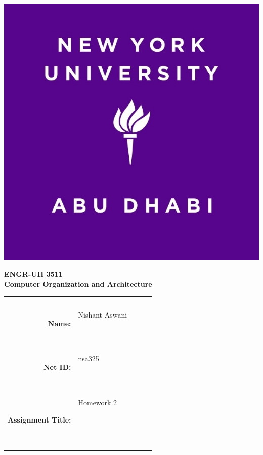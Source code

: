 \documentclass[11pt]{exam}
\newcommand{\myname}{Nishant Aswani}
\newcommand{\mynetid}{nsa325}
\newcommand{\myhwtype}{Homework}
\newcommand{\myhwnum}{2}
\newcommand{\mycoursenumber}{ENGR-UH 3511}
\newcommand{\myclassname}{Computer Organization and Architecture}
\begin{document}
\begin{center}
  \includegraphics[scale=0.15]{etc/NYUAD-alt-logo.jpg}
\end{center}

{\vspace{1.5em}}

\begin{center}
    \Huge{\textbf{\mycoursenumber}}\\
    {\vspace{0.5em}}
    \Huge{\textbf{\myclassname}}
\end{center}

{\vspace{10em}}

\begin{center}
  \begin{tabular}{|rp{5.0cm}lll|}
    \hline
    &  &  &  & \\
    &  &  &  & \\
    \Large{\textbf{Name:}} & \Large{\myname}
    
    \  &  &  & \\
    \Large{\textbf{Net ID:}} & \Large{\mynetid}
    
    \  &  &  & \\
    \Large{\textbf{Assignment Title:}} & \Large{\myhwtype{} \myhwnum}
    
    \
    
    \  &  &  & \\
    \hline
  \end{tabular}
\end{center}
\end{document}
